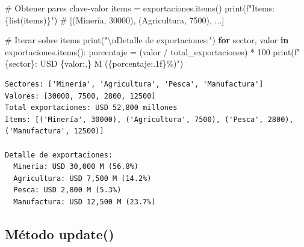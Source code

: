 \documentclass[
  doc,
  floatsintext,
  longtable,
  a4paper,
  nolmodern,
  notxfonts,
  notimes,
  12pt,
  colorlinks=true,linkcolor=blue,citecolor=blue,urlcolor=blue]{apa7}
\newenvironment{Shaded}{\begin{snugshade}}{\end{snugshade}}
\newcommand{\BuiltInTok}[1]{\textcolor[rgb]{0.00,0.23,0.31}{#1}}
\newcommand{\CharTok}[1]{\textcolor[rgb]{0.13,0.47,0.30}{#1}}
\newcommand{\CommentTok}[1]{\textcolor[rgb]{0.37,0.37,0.37}{#1}}
\newcommand{\ControlFlowTok}[1]{\textcolor[rgb]{0.00,0.23,0.31}{\textbf{#1}}}
\newcommand{\DecValTok}[1]{\textcolor[rgb]{0.68,0.00,0.00}{#1}}
\newcommand{\KeywordTok}[1]{\textcolor[rgb]{0.00,0.23,0.31}{\textbf{#1}}}
\newcommand{\NormalTok}[1]{\textcolor[rgb]{0.00,0.23,0.31}{#1}}
\newcommand{\OperatorTok}[1]{\textcolor[rgb]{0.37,0.37,0.37}{#1}}
\newcommand{\SpecialCharTok}[1]{\textcolor[rgb]{0.37,0.37,0.37}{#1}}
\newcommand{\SpecialStringTok}[1]{\textcolor[rgb]{0.13,0.47,0.30}{#1}}
\newcommand{\StringTok}[1]{\textcolor[rgb]{0.13,0.47,0.30}{#1}}
\begin{document}
\begin{Shaded}
\begin{Highlighting}[]
\CommentTok{\# Obtener pares clave{-}valor}
\NormalTok{items }\OperatorTok{=}\NormalTok{ exportaciones.items()}
\BuiltInTok{print}\NormalTok{(}\SpecialStringTok{f"Items: }\SpecialCharTok{\{}\BuiltInTok{list}\NormalTok{(items)}\SpecialCharTok{\}}\SpecialStringTok{"}\NormalTok{)}
\CommentTok{\# [(\textquotesingle{}Minería\textquotesingle{}, 30000), (\textquotesingle{}Agricultura\textquotesingle{}, 7500), ...]}

\CommentTok{\# Iterar sobre items}
\BuiltInTok{print}\NormalTok{(}\StringTok{"}\CharTok{\textbackslash{}n}\StringTok{Detalle de exportaciones:"}\NormalTok{)}
\ControlFlowTok{for}\NormalTok{ sector, valor }\KeywordTok{in}\NormalTok{ exportaciones.items():}
\NormalTok{    porcentaje }\OperatorTok{=}\NormalTok{ (valor }\OperatorTok{/}\NormalTok{ total\_exportaciones) }\OperatorTok{*} \DecValTok{100}
    \BuiltInTok{print}\NormalTok{(}\SpecialStringTok{f"  }\SpecialCharTok{\{}\NormalTok{sector}\SpecialCharTok{\}}\SpecialStringTok{: USD }\SpecialCharTok{\{}\NormalTok{valor}\SpecialCharTok{:,\}}\SpecialStringTok{ M (}\SpecialCharTok{\{}\NormalTok{porcentaje}\SpecialCharTok{:.1f\}}\SpecialStringTok{\%)"}\NormalTok{)}
\end{Highlighting}
\end{Shaded}

\begin{verbatim}
Sectores: ['Minería', 'Agricultura', 'Pesca', 'Manufactura']
Valores: [30000, 7500, 2800, 12500]
Total exportaciones: USD 52,800 millones
Items: [('Minería', 30000), ('Agricultura', 7500), ('Pesca', 2800), ('Manufactura', 12500)]

Detalle de exportaciones:
  Minería: USD 30,000 M (56.8%)
  Agricultura: USD 7,500 M (14.2%)
  Pesca: USD 2,800 M (5.3%)
  Manufactura: USD 12,500 M (23.7%)
\end{verbatim}

\subsection{Método update()}\label{muxe9todo-update}
\end{document}
